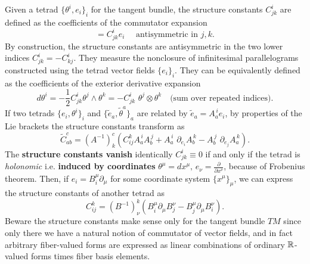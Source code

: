 \documentclass[../geometry_main.tex]{subfiles}
\begin{document}
\begin{mytheorem}
%
Given a tetrad $\{\theta^i,e_i\}_i$ for the tangent bundle, the structure constants $C^i_{jk}$ are defined as the coefficients of the commutator expansion
\begin{equation}
    [e_j, e_k] = C^i_{jk} e_i \,\, \quad \text{antisymmetric in $j,k$}.
\end{equation}
By construction, the structure constants are antisymmetric in the two lower indices $C^i_{jk} = - C^i_{kj}$.
They measure the nonclosure of infinitesimal parallelograms constructed using the tetrad vector fields $\{e_i\}_i$.
%
They can be equivalently defined as the coefficients of the exterior derivative expansion
\begin{equation}
    d \theta^i = - \frac{1}{2} C^i_{jk} \theta^j \wedge \theta^k = - C^i_{j k} \,\, \theta^j \otimes \theta^k \quad \text{(sum over repeated indices)}.
\end{equation}
%
If two tetrads $\{e_i,\theta^i\}_i$ and $\{\tilde{e}_a, \tilde{\theta}^a\}_a$ are related by $\tilde{e}_a = A_a^{\, i} e_i$, by properties of the Lie brackets the structure constants transform as
\begin{equation}
    \tilde{C}^c_{ab} = (A^{-1})^c_k \left( C^k_{ij} A_a^{\, i} A_b^{\, j} + A_a^{\, i}\,\,\partial_{e_i} A_b^{\, k} - A_b^{\, j}\,\,\partial_{e_j} A_a^{\, k} \right).
\end{equation}
The \textbf{structure constants vanish} identically $C_{jk}^i \equiv 0$ if and only if the tetrad is \emph{holonomic} i.e. \textbf{induced by coordinates}  $\theta^\mu=dx^\mu,\,e_\nu=\frac{\partial}{\partial x^\nu}$, because of Frobenius theorem.
Then, if $e_i = B_i^\mu \partial_\mu$ for some coordinate system $\{x^\mu\}_\mu$, we can express the structure constants of another tetrad as
\begin{equation}\label{eq:structure_constants_from_coordinates}
    C_{ij}^k= (B^{-1})^k_\nu \left( B_i^\mu \partial_\mu B_j^\nu - B_j^\mu \partial_\mu B_i^\nu \right).
\end{equation}
%
Beware the structure constants make sense only for the tangent bundle $TM$ since only there we have a natural notion of commutator of vector fields, and in fact arbitrary fiber-valued forms are expressed as linear combinations of ordinary $\mathbb{R}$-valued forms times fiber basis elements.
\end{mytheorem}
\end{document}

